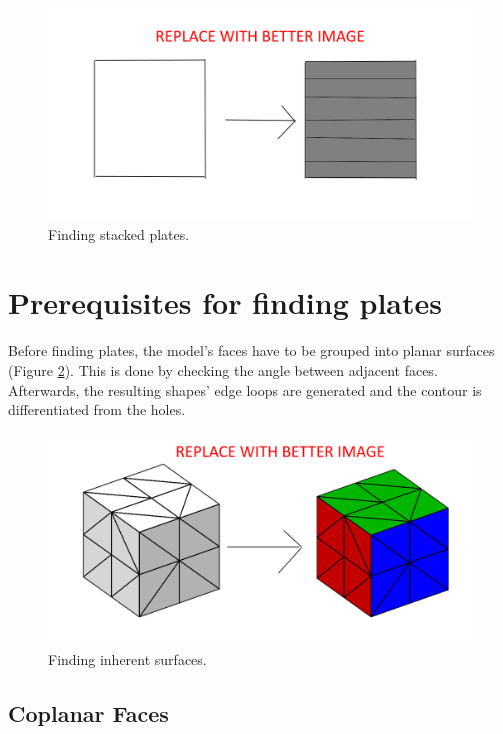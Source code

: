 \documentclass[../ClassicThesis.tex]{subfiles}
\begin{document}
\begin{figure}
    \includegraphics[width=1.0\columnwidth]{Images/plates_stackedplates.png}
    \caption{Finding stacked plates.}
    \label{fig:staplates}
\end{figure}

\section{Prerequisites for finding plates}

Before finding plates, the model's faces have to be grouped into planar surfaces (Figure \ref{fig:coplanar}). This is done by checking the angle between adjacent faces. Afterwards, the resulting shapes' edge loops are generated and the contour is differentiated from the holes.

\begin{figure}
    \includegraphics[width=1.0\columnwidth]{Images/plates_coplanar.png}
    \caption{Finding inherent surfaces.}
    \label{fig:coplanar}
\end{figure}

\subsection{Coplanar Faces}
\end{document}
